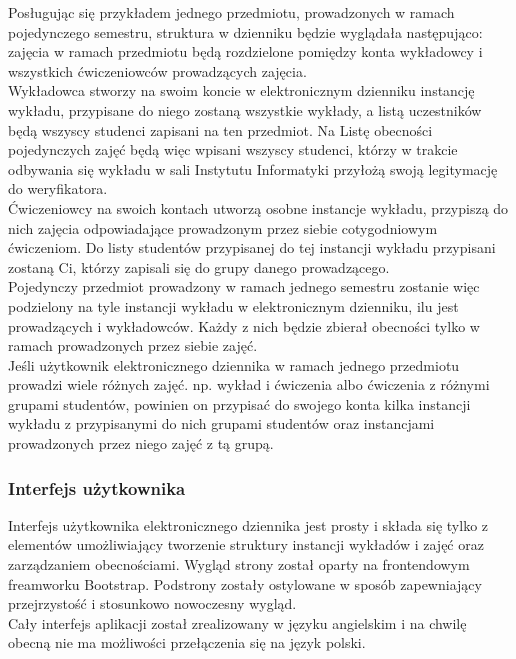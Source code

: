 \documentclass[declaration,shortabstract, mgr]{iithesis}
\begin{document}
\indent Posługując się przykładem jednego przedmiotu, prowadzonych w ramach pojedynczego semestru, struktura w dzienniku będzie wyglądała następująco: zajęcia w ramach przedmiotu będą rozdzielone pomiędzy konta wykładowcy i wszystkich ćwiczeniowców prowadzących zajęcia. \\
\indent Wykładowca stworzy na swoim koncie w elektronicznym dzienniku instancję wykładu, przypisane do niego zostaną wszystkie wykłady, a listą uczestników będą wszyscy studenci zapisani na ten przedmiot. Na Listę obecności pojedynczych zajęć będą więc wpisani wszyscy studenci, którzy w trakcie odbywania się wykładu w sali Instytutu Informatyki przyłożą swoją legitymację do weryfikatora.\\
\indent Ćwiczeniowcy na swoich kontach utworzą osobne instancje wykładu, przypiszą do nich zajęcia odpowiadające prowadzonym przez siebie cotygodniowym ćwiczeniom. Do listy studentów przypisanej do tej instancji wykładu przypisani zostaną Ci, którzy zapisali się do grupy danego prowadzącego. \\
\indent Pojedynczy przedmiot prowadzony w ramach jednego semestru zostanie więc podzielony na tyle instancji wykładu w elektronicznym dzienniku, ilu jest prowadzących i wykładowców. Każdy z nich będzie zbierał obecności tylko w ramach prowadzonych przez siebie zajęć. \\
\indent Jeśli użytkownik elektronicznego dziennika w ramach jednego przedmiotu prowadzi wiele różnych zajęć. np. wykład i ćwiczenia albo ćwiczenia z różnymi grupami studentów, powinien on przypisać do swojego konta kilka instancji wykładu z przypisanymi do nich grupami studentów oraz instancjami prowadzonych przez niego zajęć z tą grupą.

\subsubsection{Interfejs użytkownika}
\indent Interfejs użytkownika elektronicznego dziennika jest prosty i składa się tylko z elementów umożliwiający tworzenie struktury instancji wykładów i zajęć oraz zarządzaniem obecnościami. Wygląd strony został oparty na frontendowym freamworku Bootstrap\cite{bootstrap}. 
Podstrony zostały ostylowane w sposób zapewniający przejrzystość i stosunkowo nowoczesny wygląd. \\
\indent Cały interfejs aplikacji został zrealizowany w języku angielskim i na chwilę obecną nie ma możliwości przełączenia się na język polski.\\
\end{document}
